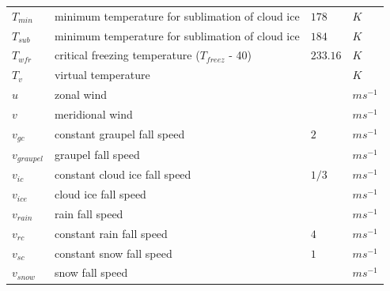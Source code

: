 \documentclass[letterpaper,titlepage,10pt]{article}
\numberwithin{equation}{section}
\begin{document}
\begin{appendices}
\begin{longtable}{p{}p{}p{}p{}}
	$T_{min}$          & minimum temperature for sublimation of cloud ice                                     & $178$                      & $K$ \\
	$T_{sub}$          & minimum temperature for sublimation of cloud ice                                     & $184$                      & $K$ \\
	$T_{wfr}$          & critical freezing temperature ($T_{freez}$ - 40)                                     & $233.16$                   & $K$ \\
	$T_v$              & virtual temperature                                                                  &                            & $K$ \\
	$u$                & zonal wind                                                                           &                            & $m s^{-1}$ \\
	$v$                & meridional wind                                                                      &                            & $m s^{-1}$ \\
	$v_{gc}$           & constant graupel fall speed                                                          & $2$                        & $m s^{-1}$ \\
	$v_{graupel}$      & graupel fall speed                                                                   &                            & $m s^{-1}$ \\
	$v_{ic}$           & constant cloud ice fall speed                                                        & $1/3$                      & $m s^{-1}$ \\
	$v_{ice}$          & cloud ice fall speed                                                                 &                            & $m s^{-1}$ \\
	$v_{rain}$         & rain fall speed                                                                      &                            & $m s^{-1}$ \\
	$v_{rc}$           & constant rain fall speed                                                             & $4$                        & $m s^{-1}$ \\
	$v_{sc}$           & constant snow fall speed                                                             & $1$                        & $m s^{-1}$ \\
	$v_{snow}$         & snow fall speed                                                                      &                            & $m s^{-1}$ \\

\end{longtable}
\end{appendices}
\end{document}
